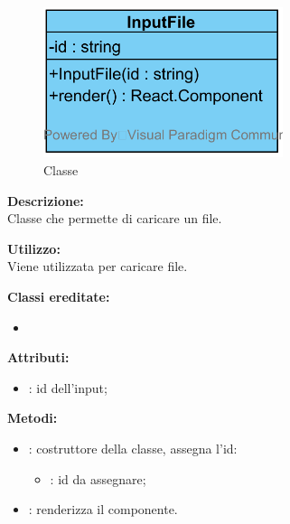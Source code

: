 \paragraph[::InputFile]{\class}\mbox{}\\ \label{\class}
\begin{figure}[H]
	\centering
	\includegraphics[width=7cm]{./diagrammi/framework/view/gui/inputfile.png}
	\caption{Classe \class}
\end{figure}
\textbf{Descrizione:}\\
Classe che permette di caricare un file.

\textbf{Utilizzo:}\\
Viene utilizzata per caricare file.

\textbf{Classi ereditate:}
\begin{itemize}
	\item {}
\end{itemize}


\textbf{Attributi:}
\begin{itemize}
	\item {}: id dell'input;
\end{itemize}

\textbf{Metodi:}
\begin{itemize}
	\item {}: costruttore della classe, assegna l'id:
	\begin{itemize}
		\item {}: id da assegnare;
	\end{itemize}
	\item {}: renderizza il componente.
\end{itemize}


